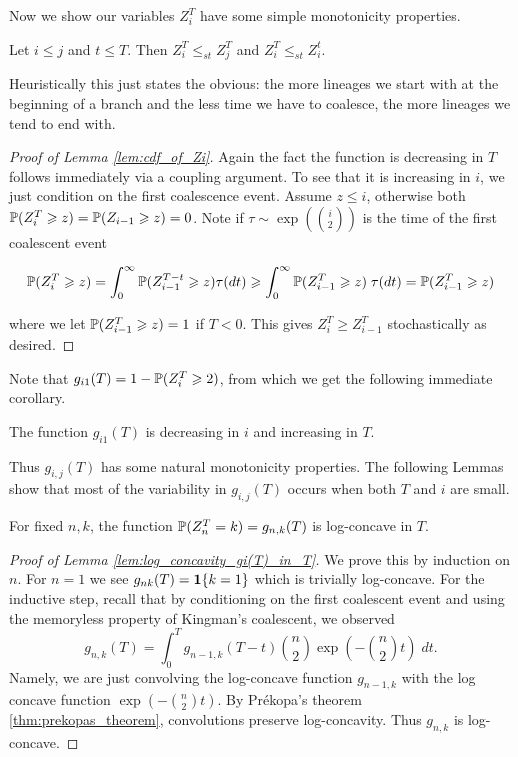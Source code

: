 \begin{subappendices}
\noindent Now we show our variables $Z_i^T$ have some simple monotonicity properties.

\begin{lemma}
\label{lem:cdf_of_Zi}
    Let $i \leq j$ and $t \leq T$. Then $Z_i^T \leq_{st} Z_j^T$ and $Z_{i}^T \leq_{st} Z_i^t$.
\end{lemma}

\noindent Heuristically this just states the obvious: the more lineages we start with at the beginning of a branch and the less time we have to coalesce, the more lineages we tend to end with.

\begin{proof}[Proof of Lemma \ref{lem:cdf_of_Zi}] Again the fact the function is decreasing in $T$ follows immediately via a coupling argument. To see that it is increasing in $i$, we just condition on the first coalescence event. Assume $z \leq i$, otherwise both $\P(Z_i^T \geq z) = \P(Z_{i-1} \geq z) = 0$. Note if $\tau \sim \exp\left(\binom{i}{2}\right)$ is the time of the first coalescent event

\[\P(Z_i^T \geq z) = \int_0^\infty \P(Z_{i-1}^{T-t} \geq z) \tau(dt) \geq \int_0^\infty \P(Z_{i-1}^T \geq z) \; \tau(dt) = \P(Z_{i-1}^T \geq z)\]

\noindent where we let $\P(Z^{T}_{i-1} \geq z) = 1$ if $T < 0$. This gives $Z_i^T \geq Z_{i-1}^T$ stochastically as desired.
\end{proof}

\noindent Note that $g_{i1}(T) = 1 - \P(Z_i^T \geq 2)$, from which we get the following immediate corollary.

\begin{corollary}
\label{corr:g_i1_is_decreasing}
    The function $g_{i1}(T)$ is decreasing in $i$ and increasing in $T$.
\end{corollary}

 Thus $g_{i,j}(T)$ has some natural monotonicity properties. The following Lemmas show that most of the variability in $g_{i,j}(T)$ occurs when both $T$ and $i$ are small.

    \begin{lemma}
\label{lem:log_concavity_gi(T)_in_T}
        For fixed $n,k$, the function $\P(Z^T_n = k) = g_{n,k}(T)$ is log-concave in $T$.
    \end{lemma}

    \begin{proof}[Proof of Lemma \ref{lem:log_concavity_gi(T)_in_T}]
    We prove this by induction on $n$. For $n=1$ we see $g_{nk}(T) = \ind\{k=1\}$ which is trivially log-concave. For the inductive step, recall that by conditioning on the first coalescent event and using the memoryless property of Kingman's coalescent, we observed
        \[g_{n,k}(T) = \int_0^T g_{n-1, k}(T-t) \binom{n}{2} \exp\left(-\binom{n}{2}t\right) \; dt. \]
    Namely, we are just convolving the log-concave function $g_{n-1,k}$ with the log concave function $\exp(-\binom{n}{2}t)$. By Pr\'ekopa's theorem \ref{thm:prekopas_theorem}, convolutions preserve log-concavity. Thus $g_{n, k}$ is log-concave.
    \end{proof}


\end{subappendices}
